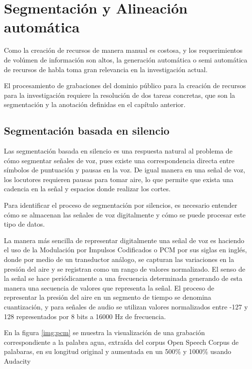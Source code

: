\chapter{Segmentación y Alineación automática}

Como la creación de recursos de manera manual es costosa, y los requerimientos de volúmen de información son altos, la generación automática o semi automática de recursos de habla toma gran relevancia en la investigación actual.

El procesamiento de grabaciones del dominio público para la creación de recursos para la investigación requiere la resolución de dos tareas concretas, que son la segmentación y la anotación definidas en el capítulo anterior.

\section{Segmentación basada en silencio}

Las segmentación basada en silencio es una respuesta natural al problema de cómo segmentar señales de voz, pues existe una correspondencia directa entre símbolos de puntuación y pausas en la voz. De igual manera en una señal de voz, los locutores requieren pausas para tomar aire, lo que permite que exista una cadencia en la señal y espacios donde realizar los cortes.

Para identificar el proceso de segmentación por silencios, es necesario entender cómo se almacenan las señales de voz digitalmente y cómo se puede procesar este tipo de datos.

La manera m\'as sencilla de representar digitalmente una señal de voz es haciendo el uso de la Modulación por Impulsos Codificados o PCM por sus siglas en inglés, donde por medio de un transductor análogo, se capturan las variaciones en la presión del aire y se registran como un rango de valores normalizado. El senso de la señal se hace periódicamente a una frecuencia determinada generando de esta manera una secuencia de valores que representa la señal. El proceso de representar la presión del aire en un segmento de tiempo se denomina cuantización, y para señales de audio se utilizan valores normalizados entre -127 y 128 representados por 8 bits a 16000 Hz de frecuencia.

En la figura \ref{img:pcm} se muestra la visualización de una grabación correspondiente a la palabra agua, extraída del corpus Open Speech Corpus de palabaras, en su longitud original y aumentada en un 500\% y 1000\% usando Audacity \cite{audacity}

